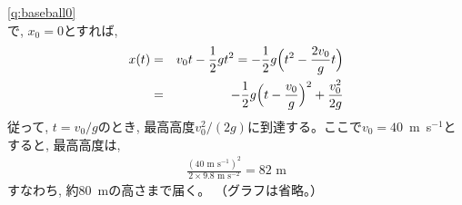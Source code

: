 \ref{q:baseball0}\\
で, $x_0=0$とすれば, 
\begin{eqnarray}
x(t)&=&v_0t-\frac{1}{2}gt^2=-\frac{1}{2}g\Bigl(t^2-\frac{2v_0}{g}t\Bigr)\\
    &=&-\frac{1}{2}g\Bigl(t-\frac{v_0}{g}\Bigr)^2+\frac{v_0^2}{2g}
\end{eqnarray}
従って, $t=v_0/g$のとき, 最高高度$v_0^2/(2g)$に到達する。ここで$v_0=40$~m~s$^{-1}$とすると, 最高高度は, 
\begin{eqnarray}
\frac{(40\text{ m s}^{-1})^2}{2\times9.8\text{ m s}^{-2}} =82\text{ m}
\end{eqnarray}
すなわち, 約80~mの高さまで届く。
（グラフは省略。）
\vspace{0.2cm}


